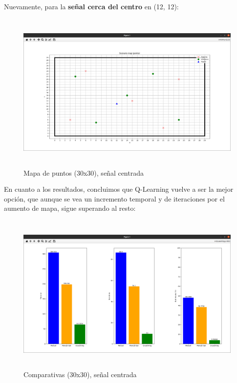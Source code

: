Nuevamente, para la \textbf{señal cerca del centro} en (12, 12):

\begin{figure} [H]
    \begin{center}
    \includegraphics[height=8cm]{imagenes/cap4/21_mapa_p_centro_30.png}
    \end{center}
    \caption[Mapa de puntos (30x30), señal centrada]{Mapa de puntos (30x30), señal centrada}
    \label{fig:map_p_center_30}
\end{figure}

En cuanto a los resultados, concluimos que Q-Learning vuelve a ser la mejor opción, que aunque se vea un incremento temporal y de iteraciones por el aumento de mapa, sigue superando al resto:\\

\begin{figure} [H]
    \begin{center}
    \includegraphics[height=8cm]{imagenes/cap4/22_comp_centro_30.png}
    \end{center}
    \caption[Comparativas (30x30), señal centrada]{Comparativas (30x30), señal centrada}
    \label{fig:comp_center_30}
\end{figure}

